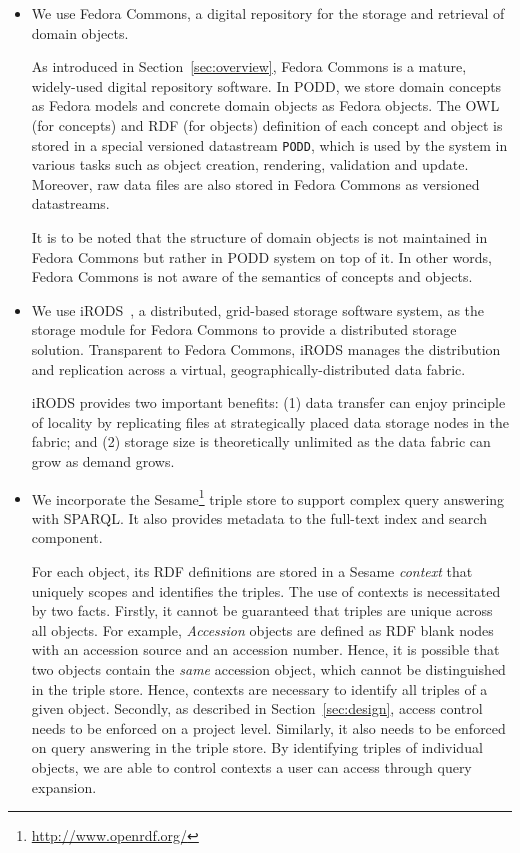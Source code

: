 \documentclass{elsarticle}
\begin{document}
\begin{itemize}
\item We use Fedora Commons, a digital repository for the
storage and retrieval of domain objects.

As introduced in Section~\ref{sec:overview}, Fedora Commons is a mature,
widely-used digital repository software. In PODD, we store domain concepts as
Fedora models and concrete domain objects as Fedora objects. The OWL (for
concepts) and RDF (for objects) definition of each concept and object
is stored in a special versioned datastream \texttt{PODD}, which is used
by the system in various tasks such as object creation, rendering, validation
and update. Moreover, raw data files are also stored in Fedora Commons
as versioned datastreams.

It is to be noted that the structure of domain objects is not maintained
in Fedora Commons but rather in PODD system on top of it. In other words,
Fedora Commons is not aware of the semantics of concepts and objects.

\item We use iRODS~\cite{irods07}, a distributed, grid-based storage
software system, as the storage module for Fedora Commons to provide
a distributed storage solution. Transparent to Fedora Commons,
iRODS manages the distribution and replication across a virtual,
geographically-distributed data fabric.

iRODS provides two important
benefits: (1) data transfer can enjoy principle of locality by
replicating files at strategically placed data storage nodes in the fabric;
and (2) storage size is theoretically unlimited as the data fabric can
grow as demand grows.

\item We incorporate the Sesame\footnote{\url{http://www.openrdf.org/}}
triple store to support complex query answering with SPARQL. It also
provides metadata to the full-text index and search component.

For each object, its RDF definitions are stored in a
Sesame \emph{context} that uniquely scopes and identifies
the triples. The use of contexts is necessitated by
two facts. Firstly, it cannot be guaranteed that triples are
unique across all objects. For example, \emph{Accession}
objects are defined as RDF blank nodes with an accession
source and an accession number. Hence, it is possible
that two objects contain the \emph{same} accession object,
which cannot be distinguished in the triple store. Hence,
contexts are necessary to identify all triples of a given
object. Secondly, as described in Section~\ref{sec:design},
access control needs to be enforced on a project level.
Similarly, it also needs to be enforced on query answering
in the triple store. By identifying triples of individual
objects, we are able to control contexts a user can access
through query expansion.


\end{itemize}
\end{document}
